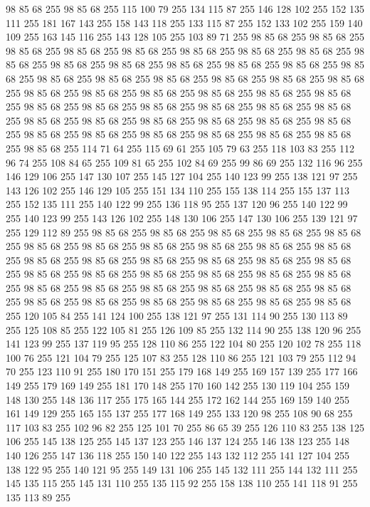 98 85 68 255 98 85 68 255 115 100 79 255 134 115 87 255 146 128 102 255 152 135 111 255 181 167 143 255 158 143 118 255 133 115 87 255 152 133 102 255 159 140 109 255 163 145 116 255 143 128 105 255 103 89 71 255 98 85 68 255 98 85 68 255 98 85 68 255 98 85 68 255 98 85 68 255 98 85 68 255 98 85 68 255 98 85 68 255 98 85 68 255 98 85 68 255 98 85 68 255 98 85 68 255 98 85 68 255 98 85 68 255 98 85 68 255 98 85 68 255 98 85 68 255 98 85 68 255 98 85 68 255 98 85 68 255 98 85 68 255 98 85 68 255 98 85 68 255 98 85 68 255 98 85 68 255 98 85 68 255 98 85 68 255 98 85 68 255 98 85 68 255 98 85 68 255 98 85 68 255 98 85 68 255 98 85 68 255 98 85 68 255 98 85 68 255 98 85 68 255 98 85 68 255 98 85 68 255 98 85 68 255 98 85 68 255 98 85 68 255 98 85 68 255 98 85 68 255 98 85 68 255 98 85 68 255 98 85 68 255 114 71 64 255 115 69 61 255 105 79 63 255 118 103 83 255
112 96 74 255 108 84 65 255 109 81 65 255 102 84 69 255 99 86 69 255 132 116 96 255 146 129 106 255 147 130 107 255 145 127 104 255 140 123 99 255 138 121 97 255 143 126 102 255 146 129 105 255 151 134 110 255 155 138 114 255 155 137 113 255 152 135 111 255 140 122 99 255 136 118 95 255 137 120 96 255 140 122 99 255 140 123 99 255 143 126 102 255 148 130 106 255 147 130 106 255 139 121 97 255 129 112 89 255 98 85 68 255 98 85 68 255 98 85 68 255 98 85 68 255 98 85 68 255 98 85 68 255 98 85 68 255 98 85 68 255 98 85 68 255 98 85 68 255 98 85 68 255 98 85 68 255 98 85 68 255 98 85 68 255 98 85 68 255 98 85 68 255 98 85 68 255 98 85 68 255 98 85 68 255 98 85 68 255 98 85 68 255 98 85 68 255 98 85 68 255 98 85 68 255 98 85 68 255 98 85 68 255 98 85 68 255 98 85 68 255 98 85 68 255 98 85 68 255 98 85 68 255 98 85 68 255 98 85 68 255 98 85 68 255 98 85 68 255 120 105 84 255 141 124 100 255
138 121 97 255 131 114 90 255 130 113 89 255 125 108 85 255 122 105 81 255 126 109 85 255 132 114 90 255 138 120 96 255 141 123 99 255 137 119 95 255 128 110 86 255 122 104 80 255 120 102 78 255 118 100 76 255 121 104 79 255 125 107 83 255 128 110 86 255 121 103 79 255 112 94 70 255 123 110 91 255 180 170 151 255 179 168 149 255 169 157 139 255 177 166 149 255 179 169 149 255 181 170 148 255 170 160 142 255 130 119 104 255 159 148 130 255 148 136 117 255 175 165 144 255 172 162 144 255 169 159 140 255 161 149 129 255 165 155 137 255 177 168 149 255 133 120 98 255 108 90 68 255 117 103 83 255 102 96 82 255 125 101 70 255 86 65 39 255 126 110 83 255 138 125 106 255 145 138 125 255 145 137 123 255 146 137 124 255 146 138 123 255 148 140 126 255 147 136 118 255 150 140 122 255 143 132 112 255 141 127 104 255 138 122 95 255 140 121 95 255 149 131 106 255 145 132 111 255 144 132 111 255 145 135 115 255 145 131 110 255 135 115 92 255 158 138 110 255 141 118 91 255 135 113 89 255

